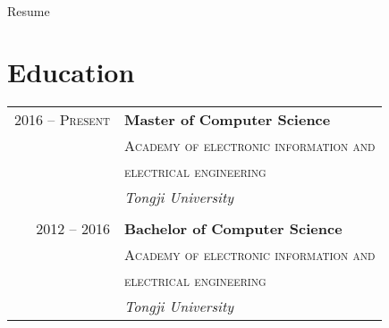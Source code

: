 \documentclass[10pt]{article} %
\begin{document}
\color{text1} %


\par{\\ %
{\color{headings} Resume} %
	

\begin{minipage}[t]{0.5\textwidth} %
\vspace{0pt} %
	

\section{Education} 

\begin{tabular}{rl} %


2016 -- \textsc{Present} & \textbf{Master of Computer Science} \\ 
& \textsc{Academy of electronic information and} \\ 
& \textsc{electrical engineering}\\
& \textit{Tongji University}\\
&\\


2012 -- 2016 & \textbf{Bachelor of Computer Science} \\ 
& \textsc{Academy of electronic information and} \\ 
& \textsc{electrical engineering}\\
& \textit{Tongji University}\\


\end{tabular}
\end{minipage}}
\end{document}
